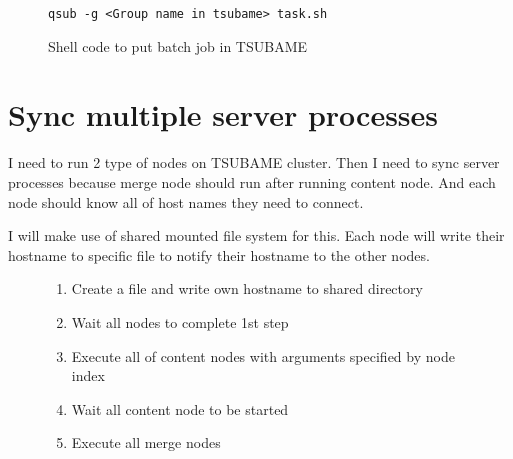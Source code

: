 \documentclass[a4]{article}
\begin{document}
\begin{figure*}
    \begin{verbatim}
qsub -g <Group name in tsubame> task.sh
    \end{verbatim}
    \caption{Shell code to put batch job in TSUBAME}
    \label{code: exec}
\end{figure*}

\section{Sync multiple server processes}

I need to run 2 type of nodes on TSUBAME cluster. 
Then I need to sync server processes because merge node should run after running content node.
And each node should know all of host names they need to connect.

I will make use of shared mounted file system for this. 
Each node will write their hostname to specific file to notify their hostname to the other nodes.

\begin{figure}[H]
\begin{enumerate}
    \item Create a file and write own hostname to shared directory
    \item Wait all nodes to complete 1st step
    \item Execute all of content nodes with arguments specified by node index
    \item Wait all content node to be started
    \item Execute all merge nodes
\end{enumerate}
\end{figure}

%

\nocite{*}
\small
\end{document}
